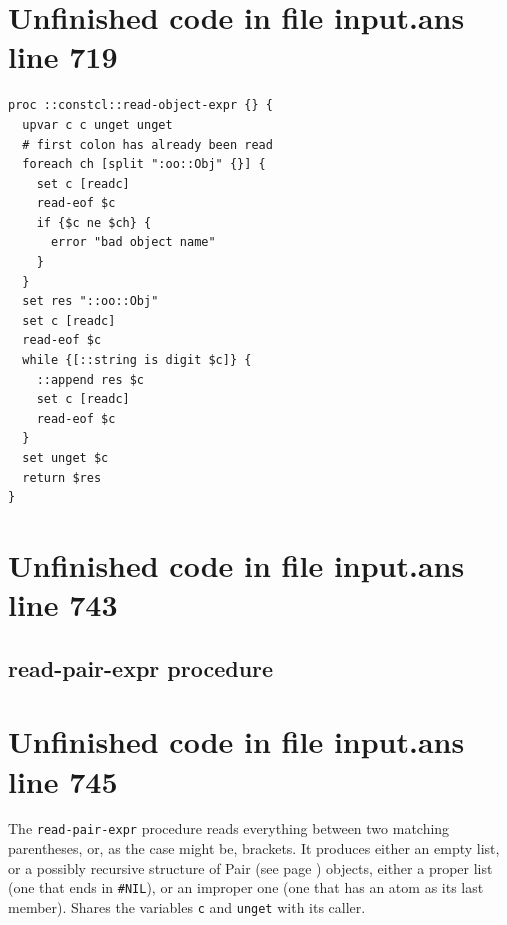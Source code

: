 \documentclass[twoside,9pt]{report}
\begin{document}
\section{Unfinished code in file input.ans line 719}
\begin{lstlisting}
proc ::constcl::read-object-expr {} {
  upvar c c unget unget
  # first colon has already been read
  foreach ch [split ":oo::Obj" {}] {
    set c [readc]
    read-eof $c
    if {$c ne $ch} {
      error "bad object name"
    }
  }
  set res "::oo::Obj"
  set c [readc]
  read-eof $c
  while {[::string is digit $c]} {
    ::append res $c
    set c [readc]
    read-eof $c
  }
  set unget $c
  return $res
}
\end{lstlisting}
\section{Unfinished code in file input.ans line 743}
\subsection{read-pair-expr procedure}
\label{read-pair-expr-procedure}
\section{Unfinished code in file input.ans line 745}


The \texttt{read-pair-expr} procedure reads everything between two matching parentheses, or, as the case might be, brackets. It produces either an empty list, or a possibly recursive structure of Pair (see page \pageref{pairs-and-lists}) objects, either a proper list (one that ends in \texttt{\#NIL}), or an improper one (one that has an atom as its last member). Shares the variables \texttt{c} and \texttt{unget} with its caller.
\end{document}
